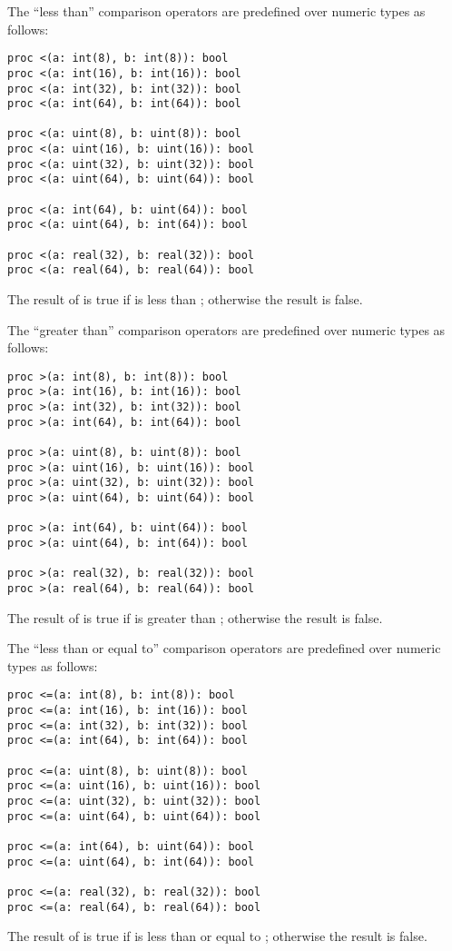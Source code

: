 The ``less than'' comparison operators are predefined over numeric
types as follows:
\begin{chapel}
\begin{verbatim}
proc <(a: int(8), b: int(8)): bool
proc <(a: int(16), b: int(16)): bool
proc <(a: int(32), b: int(32)): bool
proc <(a: int(64), b: int(64)): bool

proc <(a: uint(8), b: uint(8)): bool
proc <(a: uint(16), b: uint(16)): bool
proc <(a: uint(32), b: uint(32)): bool
proc <(a: uint(64), b: uint(64)): bool

proc <(a: int(64), b: uint(64)): bool
proc <(a: uint(64), b: int(64)): bool

proc <(a: real(32), b: real(32)): bool
proc <(a: real(64), b: real(64)): bool
\end{verbatim}
\end{chapel}
The result of  is true if  is less than ;
otherwise the result is false.

The ``greater than'' comparison operators are predefined over numeric
types as follows:
\begin{chapel}
\begin{verbatim}
proc >(a: int(8), b: int(8)): bool
proc >(a: int(16), b: int(16)): bool
proc >(a: int(32), b: int(32)): bool
proc >(a: int(64), b: int(64)): bool

proc >(a: uint(8), b: uint(8)): bool
proc >(a: uint(16), b: uint(16)): bool
proc >(a: uint(32), b: uint(32)): bool
proc >(a: uint(64), b: uint(64)): bool

proc >(a: int(64), b: uint(64)): bool
proc >(a: uint(64), b: int(64)): bool

proc >(a: real(32), b: real(32)): bool
proc >(a: real(64), b: real(64)): bool
\end{verbatim}
\end{chapel}
The result of  is true if  is greater
than ; otherwise the result is false.

The ``less than or equal to'' comparison operators are predefined over
numeric types as follows:
\begin{chapel}
\begin{verbatim}
proc <=(a: int(8), b: int(8)): bool
proc <=(a: int(16), b: int(16)): bool
proc <=(a: int(32), b: int(32)): bool
proc <=(a: int(64), b: int(64)): bool

proc <=(a: uint(8), b: uint(8)): bool
proc <=(a: uint(16), b: uint(16)): bool
proc <=(a: uint(32), b: uint(32)): bool
proc <=(a: uint(64), b: uint(64)): bool

proc <=(a: int(64), b: uint(64)): bool
proc <=(a: uint(64), b: int(64)): bool

proc <=(a: real(32), b: real(32)): bool
proc <=(a: real(64), b: real(64)): bool
\end{verbatim}
\end{chapel}
The result of  is true if  is less than or equal
to ; otherwise the result is false.

